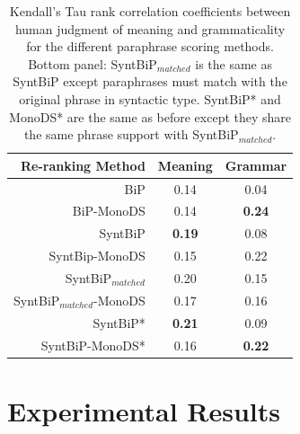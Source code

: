 \documentclass[11pt]{article}
\begin{document}

\begin{table}%
\begin{center}
\begin{tabular}{rcc}%
\hline\hline \bf \footnotesize Re-ranking Method & \bf \footnotesize Meaning & \bf \footnotesize Grammar \\ \hline
{\scriptsize BiP} & {\scriptsize 0.14} & {\scriptsize 0.04} \\
{\scriptsize BiP-MonoDS} & {\scriptsize 0.14} & {\scriptsize \bf 0.24} \\
{\scriptsize SyntBiP} & {\scriptsize \bf 0.19}& {\scriptsize 0.08} \\
{\scriptsize SyntBip-MonoDS} & {\scriptsize 0.15} & {\scriptsize 0.22} \\
\hline 
{\scriptsize SyntBiP$_{matched}$} &  {\scriptsize 0.20} & {\scriptsize 0.15} \\
{\scriptsize SyntBiP$_{matched}$-MonoDS}&  {\scriptsize 0.17} & {\scriptsize 0.16} \\
{\scriptsize SyntBiP*} &  {\scriptsize \bf 0.21} & {\scriptsize 0.09} \\
{\scriptsize SyntBiP-MonoDS*}&  {\scriptsize 0.16} & {\scriptsize \bf 0.22} \\
\hline
\end{tabular}
\end{center}
\caption{Kendall's Tau rank correlation coefficients between human judgment of meaning and grammaticality for the different paraphrase scoring methods. Bottom panel: SyntBiP$_{matched}$ is the same as SyntBiP except paraphrases must match with the original phrase in syntactic type. SyntBiP* and MonoDS* are the same as before except they share the same phrase support with SyntBiP$_{matched}$.}
\label{tbl:table4} 
\end{table}


\section{Experimental Results}
\label{sect:results_fr_en}
\end{document}

